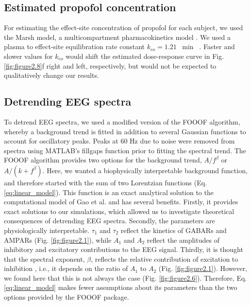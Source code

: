 \subsection{Estimated propofol concentration}
For estimating the effect-site concentration of propofol for each subject, we used the Marsh model, a multicompartment pharmacokinetics model \cite{Marsh1991}. We used a plasma to effect-site equilibration rate constant $k_{eo}=1.21$ \unit{\per\minute} ~\cite{Struys2000}. Faster and slower values for $k_{eo}$ would shift the estimated dose-response curve in Fig. \ref{fig:figure2.8}f right and left, respectively, but would not be expected to qualitatively change our results.

\subsection{Detrending EEG spectra}
To detrend EEG spectra, we used a modified version of the FOOOF algorithm\cite{Donoghue2020}, whereby a background trend is fitted in addition to several Gaussian functions to account for oscillatory peaks. Peaks at 60 \unit{\hertz} due to noise were removed from spectra using MATLAB’s fillgaps function prior to fitting the spectral trend. The FOOOF algorithm provides two options for the background trend, $A/f^\beta$ or $A/\left(k+f^\beta\right)$. Here, we wanted a biophysically interpretable background function, and therefore started with the sum of two Lorentzian functions (Eq. \ref{eq:linear_model}). This function is an exact analytical solution to the computational model of Gao et al. \cite{Gao2017} and has several benefits. Firstly, it provides exact solutions to our simulations, which allowed us to investigate theoretical consequences of detrending EEG spectra. Secondly, the parameters are physiologically interpretable. $\tau_1$ and $\tau_2$ reflect the kinetics of GABARs and AMPARs (Fig. \ref{fig:figure2.1}), while $A_1$ and $A_2$ reflect the amplitudes of inhibitory and excitatory contributions to the EEG signal. Thirdly, it is thought that the spectral exponent, $\beta$, reflects the relative contribution of excitation to inhibition \cite{Gao2017}, i.e., it depends on the ratio of $A_1$ to $A_2$ (Fig. \ref{fig:figure2.1}). However, we found here that this is not always the case (Fig. \ref{fig:figure2.6}). Therefore, Eq. \ref{eq:linear_model} makes fewer assumptions about its parameters than the two options provided by the FOOOF package.

